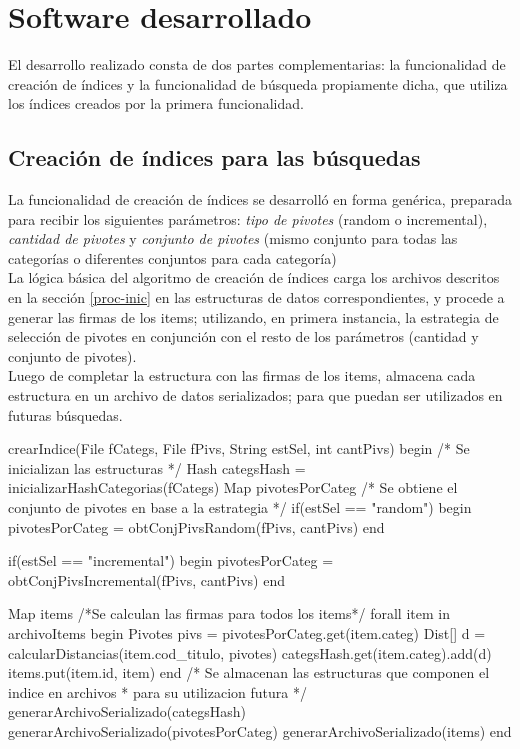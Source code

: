 \section{Software desarrollado}

El desarrollo realizado consta de dos partes complementarias: la funcionalidad de creaci\'on de \'indices y la funcionalidad de b\'usqueda propiamente dicha, que utiliza los \'indices creados por la primera funcionalidad.\\



\subsection{Creaci\'on de \'indices para las b\'usquedas}

La funcionalidad de creaci\'on de \'indices se desarroll\'o en forma gen\'erica, preparada para recibir los siguientes par\'ametros: \textit{tipo de pivotes} (random o incremental), \textit{cantidad de pivotes} y \textit{conjunto de pivotes} (mismo conjunto para todas las categor\'ias o diferentes conjuntos para cada categor\'ia)\\

La l\'ogica b\'asica del algoritmo de creaci\'on de \'indices carga los archivos descritos en la secci\'on  \ref{proc-inic} en las estructuras de datos correspondientes, y procede a generar las firmas de los items; utilizando, en primera instancia, la estrategia de selecci\'on de pivotes en conjunci\'on con el resto de los par\'ametros (cantidad y conjunto de pivotes).\\

Luego de completar la estructura con las firmas de los items, almacena cada estructura en un archivo de datos serializados; para que puedan ser utilizados en futuras b\'usquedas.\\

\begin{algorithm}[caption={Creaci\'on de \'indice}, label={alg1}]
crearIndice(File fCategs, File fPivs, String estSel, int cantPivs)
begin
 /* Se inicializan las estructuras */
 Hash categsHash = inicializarHashCategorias(fCategs)
 Map pivotesPorCateg
 /* Se obtiene el conjunto de pivotes en base a la estrategia */
 if(estSel == "random")
 begin
  pivotesPorCateg = obtConjPivsRandom(fPivs, cantPivs)
 end

 if(estSel == "incremental")
 begin
  pivotesPorCateg = obtConjPivsIncremental(fPivs, cantPivs)
 end

 Map items
 /*Se calculan las firmas para todos los items*/
 forall item in archivoItems
 begin
  Pivotes pivs = pivotesPorCateg.get(item.categ)
  Dist[] d = calcularDistancias(item.cod_titulo, pivotes)
  categsHash.get(item.categ).add(d)
  items.put(item.id, item)
 end
 /* Se almacenan las estructuras que componen el indice en archivos 
  * para su utilizacion futura */
 generarArchivoSerializado(categsHash)
 generarArchivoSerializado(pivotesPorCateg)
 generarArchivoSerializado(items)
end
\end{algorithm}

